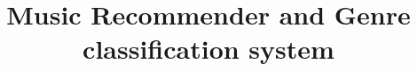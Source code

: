 \documentclass{sig-alternate-05-2015}
\begin{document}


\doi{}

\isbn{}


%
\conferenceinfo{}{}
\title{Music Recommender and Genre classification system}
\subtitle{}
%
%
%
%
%
\end{document}
